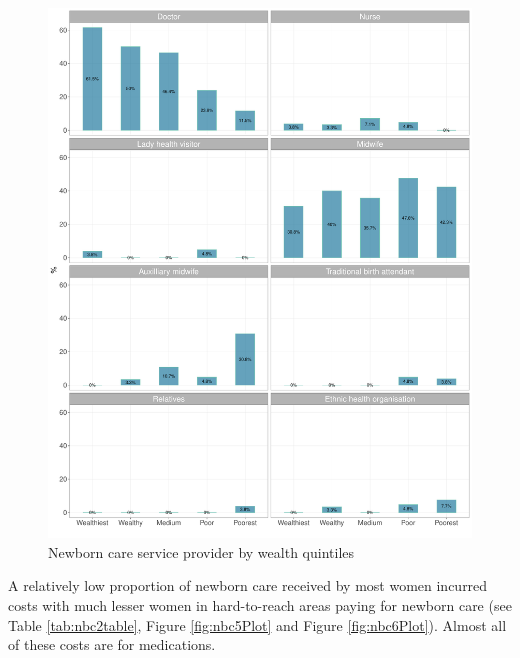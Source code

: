 \documentclass[12pt,a4paper]{article}
\begin{document}
\begin{figure}[H]

{\centering \includegraphics{kayahReport_files/figure-latex/nbc4Plot-1} 

}

\caption{Newborn care service provider by wealth quintiles}\label{fig:nbc4Plot}
\end{figure}

A relatively low proportion of newborn care received by most women incurred costs with much lesser women in hard-to-reach areas paying for newborn care (see Table \ref{tab:nbc2table}, Figure \ref{fig:nbc5Plot} and Figure \ref{fig:nbc6Plot}). Almost all of these costs are for medications.
\end{document}
